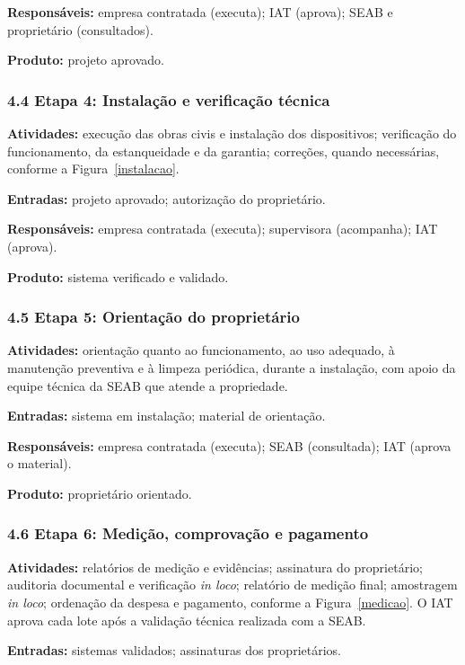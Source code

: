 \textbf{Responsáveis:} empresa contratada (executa); IAT (aprova); SEAB e proprietário (consultados).

\textbf{Produto:} projeto aprovado.

\subsubsection*{4.4 Etapa 4: Instalação e verificação técnica}

\textbf{Atividades:} execução das obras civis e instalação dos dispositivos; verificação do funcionamento, da estanqueidade e da garantia; correções, quando necessárias, conforme a Figura~\ref{instalacao}.

\textbf{Entradas:} projeto aprovado; autorização do proprietário.

\textbf{Responsáveis:} empresa contratada (executa); supervisora (acompanha); IAT (aprova).

\textbf{Produto:} sistema verificado e validado.

\subsubsection*{4.5 Etapa 5: Orientação do proprietário}

\textbf{Atividades:} orientação quanto ao funcionamento, ao uso adequado, à manutenção preventiva e à limpeza periódica, durante a instalação, com apoio da equipe técnica da SEAB que atende a propriedade.

\textbf{Entradas:} sistema em instalação; material de orientação.

\textbf{Responsáveis:} empresa contratada (executa); SEAB (consultada); IAT (aprova o material).

\textbf{Produto:} proprietário orientado.

\subsubsection*{4.6 Etapa 6: Medição, comprovação e pagamento}

\textbf{Atividades:} relatórios de medição e evidências; assinatura do proprietário; auditoria documental e verificação \textit{in loco}; relatório de medição final; amostragem \textit{in loco}; ordenação da despesa e pagamento, conforme a Figura~\ref{medicao}. O IAT aprova cada lote após a validação técnica realizada com a SEAB.

\textbf{Entradas:} sistemas validados; assinaturas dos proprietários.

